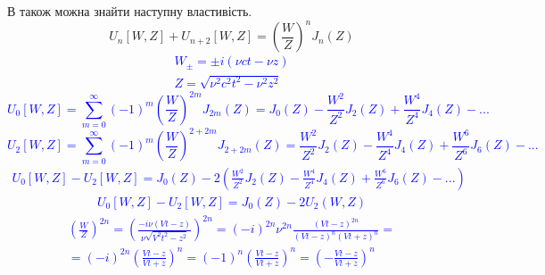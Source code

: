 В \cite{imp:Boersma1961} також можна знайти наступну властивість.
%
\begin{equation}
U_n \left[ W, Z \right] + U_{n+2} \left[ W, Z \right] = 
\left( \frac{W}{Z} \right)^n J_n (Z)
\end{equation}
%
\textcolor{blue} { \begin{equation*} \begin{aligned}
W_\pm = \pm i (\nu ct - \nu z) \\
Z = \sqrt{\nu^2 c^2t^2 - \nu^2 z^2}
\end{aligned} \end{equation*} }
%
\textcolor{blue}{ \begin{equation*}
U_0 \left[ W, Z \right] = \sum \limits_{m = 0}^{\infty} (-1)^m
\left( \frac{W}{Z} \right)^{2m} J_{2m} (Z) = J_0 (Z) - \frac{W^2}{Z^2} J_2 (Z) +
\frac{W^4}{Z^4} J_4 (Z) - ...
\end{equation*} }
%
\textcolor{blue}{ \begin{equation*}
U_2 \left[ W, Z \right] = \sum \limits_{m = 0}^{\infty} (-1)^m
\left( \frac{W}{Z} \right)^{2 + 2m} J_{2 + 2m} (Z) = 
\frac{W^2}{Z^2} J_2 (Z) - \frac{W^4}{Z^4} J_4 (Z) + \frac{W^6}{Z^6} J_6 (Z) - ...
\end{equation*} }
%
\textcolor{blue}{ \begin{equation*} \begin{aligned}
U_0 [W, Z] - U_2 [W, Z] = J_0(Z) - 2 \left( \frac{W^2}{Z^2} J_2 (Z) - 
\frac{W^4}{Z^4} J_4 (Z) + \frac{W^6}{Z^6} J_6 (Z) - ... \right)
\end{aligned} \end{equation*} }
%
\textcolor{blue}{ \begin{equation*} \begin{aligned}
U_0 [W, Z] - U_2 [W, Z] = J_0(Z) - 2 U_2(W,Z)
\end{aligned} \end{equation*} }
%
\textcolor{blue}{ \begin{equation*} \begin{aligned}
\left( \frac{W}{Z} \right)^{2n} = \left( 
\frac{- i \nu (\mathit{V}t - z)}
{\nu \sqrt{\mathit{V}^2t^2 - z^2}} \right)^{2n} = 
(-i)^{2n} \nu^{2n} \frac{(\mathit{V}t - z)^{2n}}
{(\mathit{V}t - z)^n (\mathit{V}t + z)^n} = \\
= (-i)^{2n} \left( \frac{\mathit{V}t - z}{\mathit{V}t + z} \right)^n = 
(-1)^{n} \left( \frac{\mathit{V}t - z}{\mathit{V}t + z} \right)^n = 
\left( - \frac{\mathit{V}t - z}{\mathit{V}t + z} \right)^n
\end{aligned} \end{equation*} }
